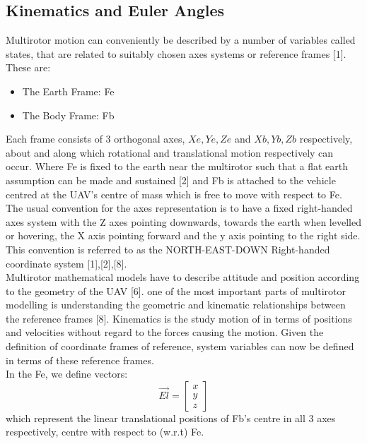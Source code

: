\documentclass[12pt,a4paper,twoside]{report}
\begin{document}
			\subsection{Kinematics and Euler Angles}
			
				Multirotor motion can conveniently be described by a number of variables called states, that are related to suitably chosen axes systems or reference frames [1]. These are:
				
				\begin{itemize}
					\item
						The Earth Frame: Fe
					\item 
						The Body Frame: Fb  
				\end{itemize}
				
				Each frame consists of 3 orthogonal axes, \(Xe,Ye,Ze\) and \(Xb,Yb,Zb\) respectively, about and along which rotational and translational motion respectively  can occur. Where Fe is fixed to the earth near the multirotor such that a flat earth assumption can be made and sustained [2] and Fb is attached to the vehicle centred at the UAV’s centre of mass which is free to move with respect to Fe. The usual convention for the axes representation is to have a fixed right-handed axes system with the Z axes pointing downwards, towards the earth when levelled or hovering, the X axis pointing forward and the y axis pointing to the right side. This convention is referred to as the NORTH-EAST-DOWN Right-handed coordinate system [1],[2],[8].
				\\
				Multirotor mathematical models have to describe attitude and position according to the geometry of the UAV [6]. one of the most important parts of multirotor modelling is understanding the geometric and kinematic relationships between the reference frames [8]. Kinematics is the study motion of in terms of positions and velocities without regard to the forces causing the motion. Given the definition of coordinate frames of reference, system variables can now be defined in terms of these reference frames.
				\\
				In the Fe, we define vectors:
				\\
				$$
				\vec{El} = 
				\begin{bmatrix}
					x \\
					y \\
					z
				\end{bmatrix}
				$$
				which represent the linear translational positions of Fb’s centre in all 3 axes respectively, centre with respect to (w.r.t) Fe.
\end{document}
